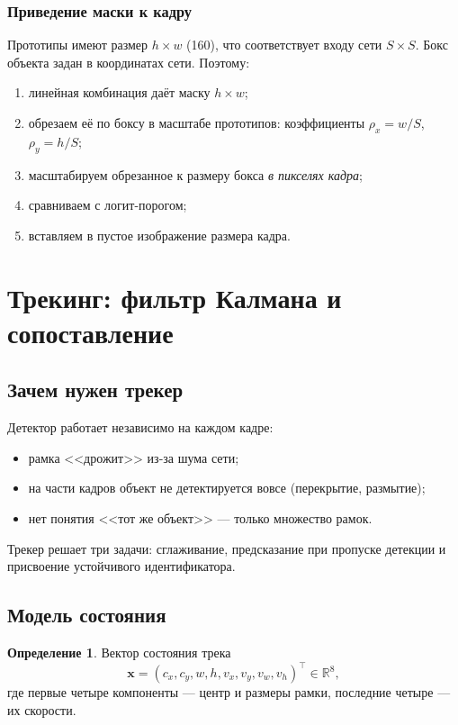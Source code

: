\documentclass[11pt,a4paper]{article}
\theoremstyle{definition}
\newtheorem{definition}{Определение}[section]
\theoremstyle{remark}
\begin{document}
\subsubsection{Приведение маски к кадру}

Прототипы имеют размер $h \times w$ (160), что соответствует входу сети
$S \times S$. Бокс объекта задан в координатах сети. Поэтому:

\begin{enumerate}
  \item линейная комбинация даёт маску $h \times w$;
  \item обрезаем её по боксу в масштабе прототипов: коэффициенты
        $\rho_x = w/S$, $\rho_y = h/S$;
  \item масштабируем обрезанное к размеру бокса \emph{в пикселях кадра};
  \item сравниваем с логит-порогом;
  \item вставляем в пустое изображение размера кадра.
\end{enumerate}

\section{Трекинг: фильтр Калмана и сопоставление}

\subsection{Зачем нужен трекер}

Детектор работает независимо на каждом кадре:
\begin{itemize}
  \item рамка <<дрожит>> из-за шума сети;
  \item на части кадров объект не детектируется вовсе (перекрытие, размытие);
  \item нет понятия <<тот же объект>> --- только множество рамок.
\end{itemize}

Трекер решает три задачи: сглаживание, предсказание при пропуске детекции и
присвоение устойчивого идентификатора.

\subsection{Модель состояния}

\begin{definition}
Вектор состояния трека
\[
  \mathbf{x} = (c_x, c_y, w, h, v_x, v_y, v_w, v_h)^\top \in \mathbb{R}^8,
\]
где первые четыре компоненты --- центр и размеры рамки, последние четыре ---
их скорости.
\end{definition}
\end{document}
